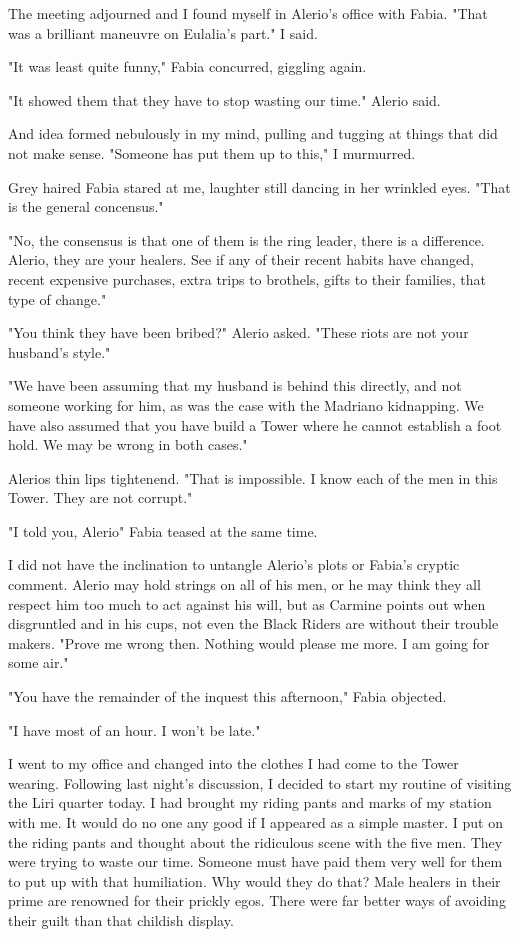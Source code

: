\documentclass{article}
\begin{document}
The meeting adjourned and I found myself in Alerio's office with Fabia. "That was a brilliant maneuvre on Eulalia's part." I said.

"It was least quite funny," Fabia concurred, giggling again.

"It showed them that they have to stop wasting our time." Alerio said.

And idea formed nebulously in my mind, pulling and tugging at things that did not make sense. "Someone has put them up to this," I murmurred.

Grey haired Fabia stared at me, laughter still dancing in her wrinkled eyes. "That is the general concensus."

"No, the consensus is that one of them is the ring leader, there is a difference. Alerio, they are your healers. See if any of their recent habits have changed, recent expensive purchases, extra trips to brothels, gifts to their families, that type of change."

"You think they have been bribed?" Alerio asked. "These riots are not your husband's style."

"We have been assuming that my husband is behind this directly, and not someone working for him, as was the case with the Madriano kidnapping. We have also assumed that you have build a Tower where he cannot establish a foot hold. We may be wrong in both cases."

Alerios thin lips tightenend. "That is impossible. I know each of the men in this Tower. They are not corrupt."

"I told you, Alerio" Fabia teased at the same time.

I did not have the inclination to untangle Alerio's plots or Fabia's cryptic comment. Alerio may hold strings on all of his men, or he may think they all respect him too much to act against his will, but as Carmine points out when disgruntled and in his cups, not even the Black Riders are without their trouble makers. "Prove me wrong then. Nothing would please me more. I am going for some air."

"You have the remainder of the inquest this afternoon," Fabia objected.

"I have most of an hour. I won't be late."

I went to my office and changed into the clothes I had come to the Tower wearing. Following last night's discussion, I decided to start my routine of visiting the Liri quarter today. I had brought my riding pants and marks of my station with me. It would do no one any good if I appeared as a simple master. I put on the riding pants and thought about the ridiculous scene with the five men. They were trying to waste our time. Someone must have paid them very well for them to put up with that humiliation. Why would they do that? Male healers in their prime are renowned for their prickly egos. There were far better ways of avoiding their guilt than that childish display. 
\end{document}

